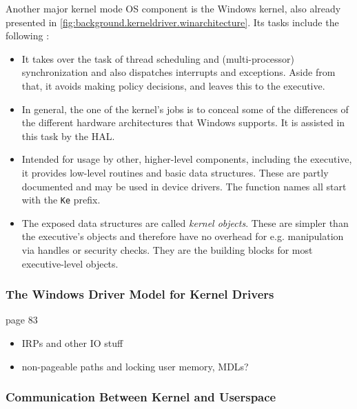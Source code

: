 Another major kernel mode OS component is the Windows kernel, also already presented in \autoref{fig:background.kerneldriver.winarchitecture}. Its tasks include the following \cite{Yosifovich2017}:
\begin{itemize}
	\item It takes over the task of thread scheduling and (multi-processor) synchronization and also dispatches interrupts and exceptions. Aside from that, it avoids making policy decisions, and leaves this to the executive.
	\item In general, the one of the kernel's jobs is to conceal some of the differences of the different hardware architectures that Windows supports. It is assisted in this task by the HAL.
	\item Intended for usage by other, higher-level components, including the executive, it provides low-level routines and basic data structures. These are partly documented and may be used in device drivers. The function names all start with the \texttt{Ke} prefix.
	\item The exposed data structures are called \emph{kernel objects}. These are simpler than the executive's objects and therefore have no overhead for e.g. manipulation via handles or security checks. They are the building blocks for most executive-level objects.
\end{itemize}

\subsubsection{The Windows Driver Model for Kernel Drivers}
\label{chap:background.kerneldriver.wdm}
page 83

\begin{itemize}
	\item IRPs and other IO stuff
	\item non-pageable paths and locking user memory, MDLs?
\end{itemize}

\subsubsection{Communication Between Kernel and Userspace}
\label{chap:background.kerneldriver.communication}

